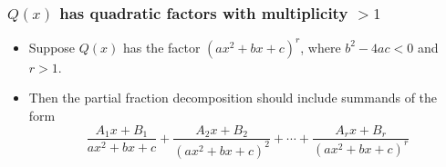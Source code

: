 \begin{frame}
\frametitle{$Q(x)$ has quadratic factors with multiplicity $>1$}
\begin{itemize}
\item Suppose $Q(x)$ has the factor $(ax^2 + bx+c)^r$, where $b^2-4ac < 0$ and $r>1$.
\item<2-> Then the partial fraction decomposition should include summands of the form
\[
\frac{A_1x+B_1}{ax^2+bx+c} + %
\frac{A_2x+B_2}{(ax^2+bx+c)^2} + %
 \cdots + %
\frac{A_rx+B_r}{(ax^2+bx+c)^r} %
\]
\end{itemize}

\end{frame}
